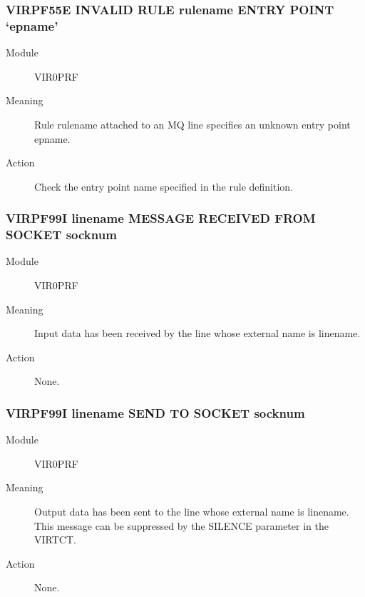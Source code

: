 \documentclass[letterpaper,10pt,english]{sphinxmanual}
\begin{document}
\subsubsection{VIRPF55E INVALID RULE rulename ENTRY POINT ‘epname’}
\label{\detokenize{messages:virpf55e-invalid-rule-rulename-entry-point-epname}}\begin{description}
\item[{Module}] \leavevmode
VIR0PRF

\item[{Meaning}] \leavevmode
Rule rulename attached to an MQ line specifies an unknown entry point epname.

\item[{Action}] \leavevmode
Check the entry point name specified in the rule definition.

\end{description}


\subsubsection{VIRPF99I linename MESSAGE RECEIVED FROM SOCKET socknum}
\label{\detokenize{messages:virpf99i-linename-message-received-from-socket-socknum}}\begin{description}
\item[{Module}] \leavevmode
VIR0PRF

\item[{Meaning}] \leavevmode
Input data has been received by the line whose external name is linename.

\item[{Action}] \leavevmode
None.

\end{description}


\subsubsection{VIRPF99I linename SEND TO SOCKET socknum}
\label{\detokenize{messages:virpf99i-linename-send-to-socket-socknum}}\begin{description}
\item[{Module}] \leavevmode
VIR0PRF

\item[{Meaning}] \leavevmode
Output data has been sent to the line whose external name is linename. This message can be suppressed by the SILENCE parameter in the VIRTCT.

\item[{Action}] \leavevmode
None.

\end{description}
\end{document}
